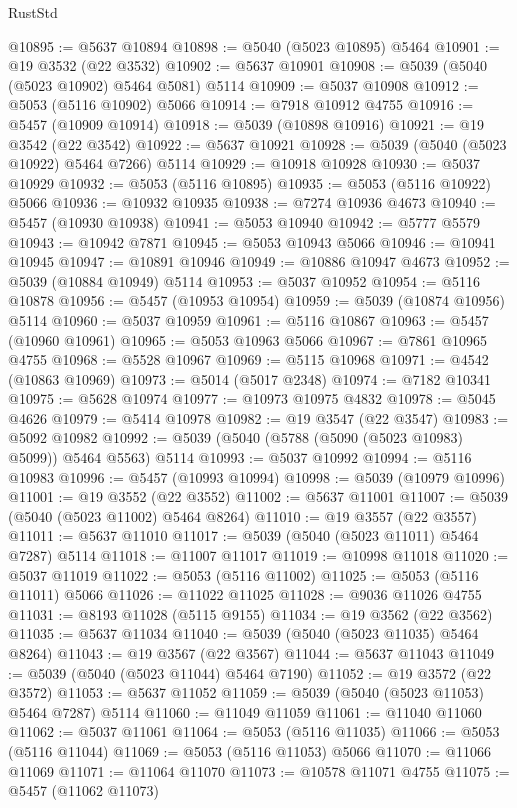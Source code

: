 \begin{lexlean}{RustStd}
\begin{coremodule}
@10895 := @5637 @10894
@10898 := @5040 (@5023 @10895) @5464
@10901 := @19 @3532 (@22 @3532)
@10902 := @5637 @10901
@10908 := @5039 (@5040 (@5023 @10902) @5464 @5081) @5114
@10909 := @5037 @10908
@10912 := @5053 (@5116 @10902) @5066
@10914 := @7918 @10912 @4755
@10916 := @5457 (@10909 @10914)
@10918 := @5039 (@10898 @10916)
@10921 := @19 @3542 (@22 @3542)
@10922 := @5637 @10921
@10928 := @5039 (@5040 (@5023 @10922) @5464 @7266) @5114
@10929 := @10918 @10928
@10930 := @5037 @10929
@10932 := @5053 (@5116 @10895)
@10935 := @5053 (@5116 @10922) @5066
@10936 := @10932 @10935
@10938 := @7274 @10936 @4673
@10940 := @5457 (@10930 @10938)
@10941 := @5053 @10940
@10942 := @5777 @5579
@10943 := @10942 @7871
@10945 := @5053 @10943 @5066
@10946 := @10941 @10945
@10947 := @10891 @10946
@10949 := @10886 @10947 @4673
@10952 := @5039 (@10884 @10949) @5114
@10953 := @5037 @10952
@10954 := @5116 @10878
@10956 := @5457 (@10953 @10954)
@10959 := @5039 (@10874 @10956) @5114
@10960 := @5037 @10959
@10961 := @5116 @10867
@10963 := @5457 (@10960 @10961)
@10965 := @5053 @10963 @5066
@10967 := @7861 @10965 @4755
@10968 := @5528 @10967
@10969 := @5115 @10968
@10971 := @4542 (@10863 @10969)
@10973 := @5014 (@5017 @2348)
@10974 := @7182 @10341
@10975 := @5628 @10974
@10977 := @10973 @10975 @4832
@10978 := @5045 @4626
@10979 := @5414 @10978
@10982 := @19 @3547 (@22 @3547)
@10983 := @5092 @10982
@10992 := @5039 (@5040 (@5788 (@5090 (@5023 @10983) @5099)) @5464 @5563) @5114
@10993 := @5037 @10992
@10994 := @5116 @10983
@10996 := @5457 (@10993 @10994)
@10998 := @5039 (@10979 @10996)
@11001 := @19 @3552 (@22 @3552)
@11002 := @5637 @11001
@11007 := @5039 (@5040 (@5023 @11002) @5464 @8264)
@11010 := @19 @3557 (@22 @3557)
@11011 := @5637 @11010
@11017 := @5039 (@5040 (@5023 @11011) @5464 @7287) @5114
@11018 := @11007 @11017
@11019 := @10998 @11018
@11020 := @5037 @11019
@11022 := @5053 (@5116 @11002)
@11025 := @5053 (@5116 @11011) @5066
@11026 := @11022 @11025
@11028 := @9036 @11026 @4755
@11031 := @8193 @11028 (@5115 @9155)
@11034 := @19 @3562 (@22 @3562)
@11035 := @5637 @11034
@11040 := @5039 (@5040 (@5023 @11035) @5464 @8264)
@11043 := @19 @3567 (@22 @3567)
@11044 := @5637 @11043
@11049 := @5039 (@5040 (@5023 @11044) @5464 @7190)
@11052 := @19 @3572 (@22 @3572)
@11053 := @5637 @11052
@11059 := @5039 (@5040 (@5023 @11053) @5464 @7287) @5114
@11060 := @11049 @11059
@11061 := @11040 @11060
@11062 := @5037 @11061
@11064 := @5053 (@5116 @11035)
@11066 := @5053 (@5116 @11044)
@11069 := @5053 (@5116 @11053) @5066
@11070 := @11066 @11069
@11071 := @11064 @11070
@11073 := @10578 @11071 @4755
@11075 := @5457 (@11062 @11073)

\end{coremodule}
\end{lexlean}

